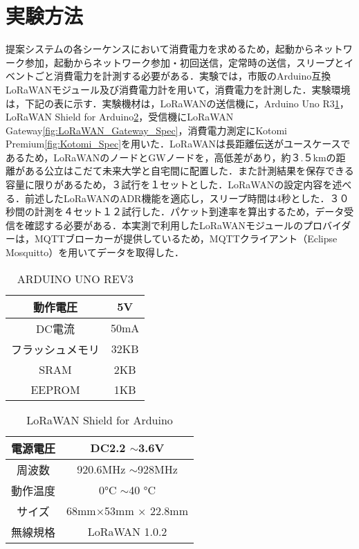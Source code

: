 \section{実験方法}
提案システムの各シーケンスにおいて消費電力を求めるため，起動からネットワーク参加，起動からネットワーク参加・初回送信，定常時の送信，スリープとイベントごと消費電力を計測する必要がある．実験では，市販のArduino互換LoRaWANモジュール及び消費電力計を用いて，消費電力を計測した．実験環境は，下記の表に示す．実験機材は，LoRaWANの送信機に，Arduino Uno R3\ref{fig:Arduino_Spec}，LoRaWAN Shield for Arduino\ref{fig:LoRaWAN_Spec}，受信機にLoRaWAN Gateway\ref{fig:LoRaWAN_Gateway_Spec}，消費電力測定にKotomi Premium\ref{fig:Kotomi_Spec}を用いた．LoRaWANは長距離伝送がユースケースであるため，LoRaWANのノードとGWノードを，高低差があり，約３.５kmの距離がある公立はこだて未来大学と自宅間に配置した．また計測結果を保存できる容量に限りがあるため，３試行を１セットとした．LoRaWANの設定内容を述べる．前述したLoRaWANのADR機能を適応し，スリープ時間は4秒とした．３０秒間の計測を４セット１２試行した．パケット到達率を算出するため，データ受信を確認する必要がある．本実測で利用したLoRaWANモジュールのプロバイダーは，MQTTブローカーが提供しているため，MQTTクライアント（Eclipse Mosquitto）を用いてデータを取得した．

\begin{table}[]
    \caption{ARDUINO UNO REV3}\label{fig:Arduino_Spec}
    \centering
    \begin{tabular}{|c|c|}
    \hline
    動作電圧     & 5V   \\ \hline
    DC電流     & 50mA \\ \hline
    フラッシュメモリ & 32KB \\ \hline
    SRAM     & 2KB  \\ \hline
    EEPROM   & 1KB  \\ \hline
    \end{tabular}
\end{table}

\begin{table}[]
    \caption{LoRaWAN Shield for Arduino}\label{fig:LoRaWAN_Spec}
    \centering
    \begin{tabular}{|c|c|}
    \hline
    電源電圧 & DC2.2 $\sim$3.6V      \\ \hline
    周波数  & 920.6MHz $\sim$928MHz \\ \hline
    動作温度 & 0°C $\sim$40 °C       \\ \hline
    サイズ  & 68mm×53mm × 22.8mm    \\ \hline
    無線規格 & LoRaWAN 1.0.2         \\ \hline
    \end{tabular}
\end{table}

